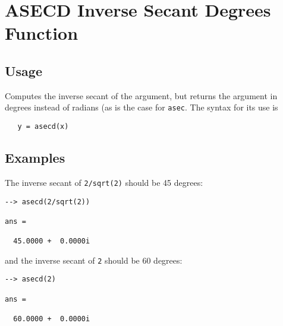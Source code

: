 \section{ASECD Inverse Secant Degrees Function}

\subsection{Usage}

Computes the inverse secant of the argument, but returns
the argument in degrees instead of radians (as is the case
for \verb|asec|. The syntax for its use is
\begin{verbatim}
   y = asecd(x)
\end{verbatim}
\subsection{Examples}

The inverse secant of \verb|2/sqrt(2)| should be 45 degrees:
\begin{verbatim}
--> asecd(2/sqrt(2))

ans = 

  45.0000 +  0.0000i 
\end{verbatim}
and the inverse secant of \verb|2| should be 60 degrees:
\begin{verbatim}
--> asecd(2)

ans = 

  60.0000 +  0.0000i 
\end{verbatim}
